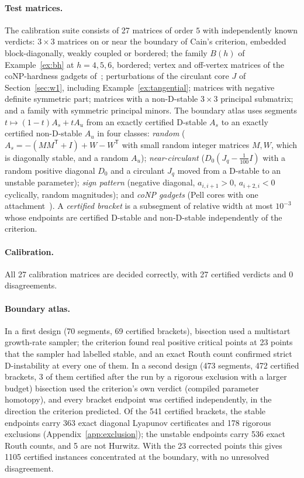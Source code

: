 \paragraph{Test matrices.} The calibration suite consists of 27 matrices of order $5$ with independently known verdicts: $3\times3$ matrices on or near the boundary of Cain's criterion, embedded block-diagonally, weakly coupled or bordered; the family $B(h)$ of Example~\ref{ex:bh} at $h=4,5,6$, bordered; vertex and off-vertex matrices of the coNP-hardness gadgets of~\cite{companion_conp}; perturbations of the circulant core $J$ of Section~\ref{sec:w1}, including Example~\ref{ex:tangential}; matrices with negative definite symmetric part; matrices with a non-D-stable $3\times3$ principal submatrix; and a family with symmetric principal minors. The boundary atlas uses segments $t\mapsto(1-t)A_s+tA_u$ from an exactly certified D-stable $A_s$ to an exactly certified non-D-stable $A_u$ in four classes: \emph{random} ($A_s=-(MM^{\mathsf T}+I)+W-W^{\mathsf T}$ with small random integer matrices $M,W$, which is diagonally stable, and a random $A_u$); \emph{near-circulant} ($D_0(J_q-\frac1{100}I)$ with a random positive diagonal $D_0$ and a circulant $J_q$ moved from a D-stable to an unstable parameter); \emph{sign pattern} (negative diagonal, $a_{i,i+1}>0$, $a_{i+2,i}<0$ cyclically, random magnitudes); and \emph{coNP gadgets} (Pell cores with one attachment~\cite{companion_conp}). A \emph{certified bracket} is a subsegment of relative width at most $10^{-3}$ whose endpoints are certified D-stable and non-D-stable independently of the criterion.

\paragraph{Calibration.} All 27 calibration matrices are decided correctly, with 27 certified verdicts and 0 disagreements.

\paragraph{Boundary atlas.} In a first design (70 segments, 69 certified brackets), bisection used a multistart growth-rate sampler; the criterion found real positive critical points at 23 points that the sampler had labelled stable, and an exact Routh count confirmed strict D-instability at every one of them. In a second design (473 segments, 472 certified brackets, 3 of them certified after the run by a rigorous exclusion with a larger budget) bisection used the criterion's own verdict (compiled parameter homotopy), and every bracket endpoint was certified independently, in the direction the criterion predicted. Of the 541 certified brackets, the stable endpoints carry 363 exact diagonal Lyapunov certificates and 178 rigorous exclusions (Appendix~\ref{app:exclusion}); the unstable endpoints carry 536 exact Routh counts, and 5 are not Hurwitz. With the 23 corrected points this gives 1105 certified instances concentrated at the boundary, with no unresolved disagreement.

